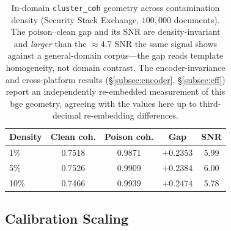 \documentclass[10pt,journal,compsoc]{IEEEtran}
\begin{document}
\begin{table}[t]
\centering
\caption{In-domain \texttt{cluster\_coh} geometry across contamination density
(Security Stack Exchange, $100{,}000$ documents). The poison--clean gap and its
SNR are density-invariant and \emph{larger} than the $\approx\!4.7$ SNR the same
signal shows against a general-domain corpus---the gap reads template homogeneity,
not domain contrast. The encoder-invariance and cross-platform results
(\S\ref{subsec:encoder}, \S\ref{subsec:eff}) report an independently re-embedded measurement of
this bge geometry, agreeing with the values here up to third-decimal re-embedding differences.}
\label{tab:coh}
\begin{tabular}{lcccc}
\toprule
Density & Clean coh. & Poison coh. & Gap & SNR \\
\midrule
1\%  & 0.7518 & 0.9871 & $+0.2353$ & 5.99 \\
5\%  & 0.7526 & 0.9909 & $+0.2384$ & 6.00 \\
10\% & 0.7466 & 0.9939 & $+0.2474$ & 5.78 \\
\bottomrule
\end{tabular}
\end{table}

\subsection{Calibration Scaling}
\label{subsec:calib}
\end{document}
